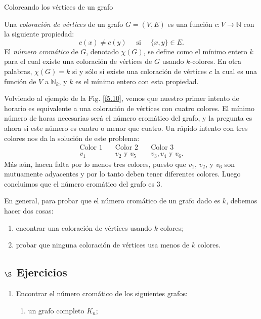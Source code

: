 \begin{section}{Coloreando los vértices de un grafo}
\begin{definicion} Una {\em coloración de vértices} de un  
grafo $G=(V,E)$ es una función $c:V \to  \mathbb N$ con la
siguiente propiedad:
$$
c(x)\not= c(y) \quad \text{ si } \quad \{x,y\} \in E.
$$
El {\em número cromático} de $G$, denotado $\chi(G)$, se define
 como el mínimo entero $k$ para el cual
existe una coloración de vértices de $G$ usando $k$-colores. En
otra palabras, $\chi(G)=k$ si  y sólo si existe una coloración de
vértices $c$ la cual es una función de $V$ a $\mathbb N_k$, y $k$
es el mínimo entero con esta propiedad.
\end{definicion}

Volviendo al ejemplo de la Fig. \ref{f5.10}, vemos que nuestro
primer intento de horario es equivalente a una coloración de
vértices con cuatro colores. El mínimo número de horas necesarias
será el número cromático del grafo, y la pregunta es ahora si este
número es cuatro o menor que cuatro. Un rápido intento con tres
colores nos da la solución de este problema:
$$
\begin{matrix}
\text{Color 1}\quad &\text{Color 2}\quad&\text{Color 3} \\
v_1 &v_2 \text{ y } v_5 \quad & v_3,v_4 \text{ y } v_6 .
\end{matrix}
$$
Más aún, hacen falta por lo menos tres colores, puesto que $v_1$,
$v_2$, y $v_6$ son mutuamente adyacentes y por lo tanto deben
tener diferentes colores. Luego concluimos que el número cromático
del grafo es $3$.

En general, para probar que el número cromático de un grafo dado
es $k$, debemos hacer dos cosas:
\begin{enumerate}[label=(\alph*)]
\item  encontrar una coloración de vértices usando $k$ colores;
\item  probar que ninguna coloración de vértices usa menos de $k$ colores.
\end{enumerate}



\subsection*{\Large $\S$ Ejercicios}\label{ejercicios5.6}
\begin{enumerate}
\item \label{ejercicio5.6.1} Encontrar el número cromático de los siguientes grafos:
\begin{enumerate}
	\item un grafo completo $K_n$;
	

\end{enumerate}
\end{enumerate}
\end{section}
